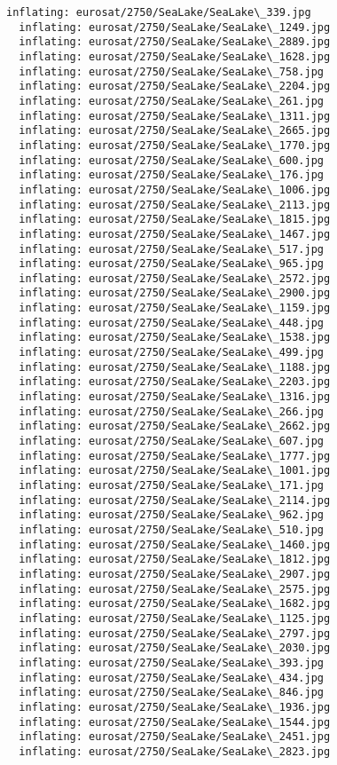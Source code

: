 \documentclass[11pt]{article}
\begin{document}
\begin{Verbatim}[commandchars=\\\{\}]
  inflating: eurosat/2750/SeaLake/SeaLake\_339.jpg
  inflating: eurosat/2750/SeaLake/SeaLake\_1249.jpg
  inflating: eurosat/2750/SeaLake/SeaLake\_2889.jpg
  inflating: eurosat/2750/SeaLake/SeaLake\_1628.jpg
  inflating: eurosat/2750/SeaLake/SeaLake\_758.jpg
  inflating: eurosat/2750/SeaLake/SeaLake\_2204.jpg
  inflating: eurosat/2750/SeaLake/SeaLake\_261.jpg
  inflating: eurosat/2750/SeaLake/SeaLake\_1311.jpg
  inflating: eurosat/2750/SeaLake/SeaLake\_2665.jpg
  inflating: eurosat/2750/SeaLake/SeaLake\_1770.jpg
  inflating: eurosat/2750/SeaLake/SeaLake\_600.jpg
  inflating: eurosat/2750/SeaLake/SeaLake\_176.jpg
  inflating: eurosat/2750/SeaLake/SeaLake\_1006.jpg
  inflating: eurosat/2750/SeaLake/SeaLake\_2113.jpg
  inflating: eurosat/2750/SeaLake/SeaLake\_1815.jpg
  inflating: eurosat/2750/SeaLake/SeaLake\_1467.jpg
  inflating: eurosat/2750/SeaLake/SeaLake\_517.jpg
  inflating: eurosat/2750/SeaLake/SeaLake\_965.jpg
  inflating: eurosat/2750/SeaLake/SeaLake\_2572.jpg
  inflating: eurosat/2750/SeaLake/SeaLake\_2900.jpg
  inflating: eurosat/2750/SeaLake/SeaLake\_1159.jpg
  inflating: eurosat/2750/SeaLake/SeaLake\_448.jpg
  inflating: eurosat/2750/SeaLake/SeaLake\_1538.jpg
  inflating: eurosat/2750/SeaLake/SeaLake\_499.jpg
  inflating: eurosat/2750/SeaLake/SeaLake\_1188.jpg
  inflating: eurosat/2750/SeaLake/SeaLake\_2203.jpg
  inflating: eurosat/2750/SeaLake/SeaLake\_1316.jpg
  inflating: eurosat/2750/SeaLake/SeaLake\_266.jpg
  inflating: eurosat/2750/SeaLake/SeaLake\_2662.jpg
  inflating: eurosat/2750/SeaLake/SeaLake\_607.jpg
  inflating: eurosat/2750/SeaLake/SeaLake\_1777.jpg
  inflating: eurosat/2750/SeaLake/SeaLake\_1001.jpg
  inflating: eurosat/2750/SeaLake/SeaLake\_171.jpg
  inflating: eurosat/2750/SeaLake/SeaLake\_2114.jpg
  inflating: eurosat/2750/SeaLake/SeaLake\_962.jpg
  inflating: eurosat/2750/SeaLake/SeaLake\_510.jpg
  inflating: eurosat/2750/SeaLake/SeaLake\_1460.jpg
  inflating: eurosat/2750/SeaLake/SeaLake\_1812.jpg
  inflating: eurosat/2750/SeaLake/SeaLake\_2907.jpg
  inflating: eurosat/2750/SeaLake/SeaLake\_2575.jpg
  inflating: eurosat/2750/SeaLake/SeaLake\_1682.jpg
  inflating: eurosat/2750/SeaLake/SeaLake\_1125.jpg
  inflating: eurosat/2750/SeaLake/SeaLake\_2797.jpg
  inflating: eurosat/2750/SeaLake/SeaLake\_2030.jpg
  inflating: eurosat/2750/SeaLake/SeaLake\_393.jpg
  inflating: eurosat/2750/SeaLake/SeaLake\_434.jpg
  inflating: eurosat/2750/SeaLake/SeaLake\_846.jpg
  inflating: eurosat/2750/SeaLake/SeaLake\_1936.jpg
  inflating: eurosat/2750/SeaLake/SeaLake\_1544.jpg
  inflating: eurosat/2750/SeaLake/SeaLake\_2451.jpg
  inflating: eurosat/2750/SeaLake/SeaLake\_2823.jpg

\end{Verbatim}
\end{document}
